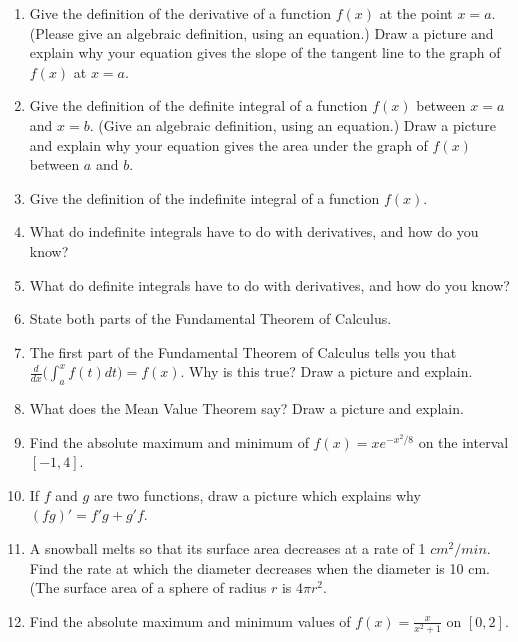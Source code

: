 \documentclass[12pt]{article}
\begin{document}
\begin{enumerate}[(1)]

\item
Give the definition of the derivative of a function 
$f(x)$ at the point $x = a$. (Please give an algebraic
definition, using an equation.) Draw a picture and
explain why your equation gives the slope of the tangent
line to the graph of $f(x)$ at $x = a$.

\item
Give the definition of the definite integral of a function
$f(x)$ between $x = a$ and $x = b$. (Give an
algebraic definition, using an equation.)
Draw a picture and explain why your equation
gives the area under the graph of $f(x)$ between
$a$ and $b$.

\item
Give the definition of the indefinite integral
of a function $f(x)$.

\item
What do indefinite integrals have to do with derivatives, and how do you
know?

\item
What do definite integrals have to do with derivatives, and how do you know?

\item
State both parts of the Fundamental Theorem of Calculus.

\item
The first part of the Fundamental Theorem of Calculus tells you that
$\frac{d}{dx}\bigg( \int_a^x f(t) dt \bigg) = f(x)$. Why is this
true? Draw a picture and explain.

\item
What does the Mean Value Theorem say? Draw a picture and explain.

\item
Find the absolute maximum and minimum of $f(x) = x e^{-x^2/8}$ on the interval $[-1, 4]$.

\item
If $f$ and $g$ are two functions, draw a picture which explains why $(fg)' = f' g + g' f$.

\item
A snowball melts so that its surface area decreases at a rate of 1 $cm^2/min$. Find the rate
at which the diameter decreases when the diameter is 10 cm. (The surface area of a sphere of radius
$r$ is $4 \pi r^2$.

\item
Find the absolute maximum and minimum values of $f(x) = \frac{x}{x^2 + 1}$ on $[0, 2]$.


\end{enumerate}
\end{document}
